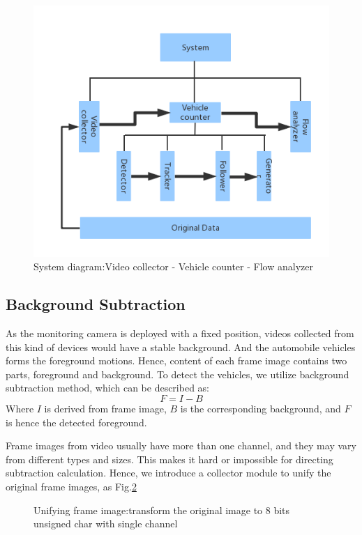 \documentclass[draftclsnofoot,onecolumn]{IEEEtran}
\begin{document}
	\begin{figure}[!h]
	\centering
	\includegraphics[width=0.8\linewidth]{diagram1.png} 
	\caption{System diagram:Video collector - Vehicle counter - Flow analyzer}
	\label{fig:sysDiagram}
	\end{figure}
	
	
	\subsection{Background Subtraction}
	As the monitoring camera is deployed with a fixed position, videos collected from this kind of devices would have a stable background. And the automobile vehicles forms the foreground motions. Hence, content of each frame image contains two parts, foreground and background. To detect the vehicles, we utilize background subtraction method, which can be described as:
	\begin{equation}
	F = I  - B
	\label{eq:backgroundSubtraction}
	\end{equation}
	Where $I$ is derived from frame image, $B$ is the corresponding background, and $F$ is hence the detected foreground.
	
	Frame images from video usually have more than one channel, and they may vary from different types and sizes. This makes it hard or impossible for directing subtraction calculation. Hence, we introduce a collector module to unify the original frame images, as Fig.\ref{fig:unifyDiagram}
	\begin{figure}[!h]
	\centering
	\caption{Unifying frame image:transform the original image to 8 bits unsigned char with single channel}
	\label{fig:unifyDiagram}
	\end{figure}
	
\end{document}
